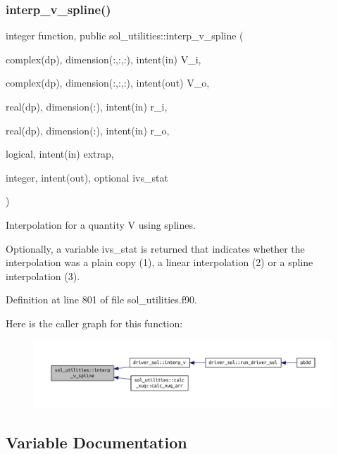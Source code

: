 \subsubsection{\texorpdfstring{interp\+\_\+v\+\_\+spline()}{interp\_v\_spline()}}
{\footnotesize\ttfamily integer function, public sol\+\_\+utilities\+::interp\+\_\+v\+\_\+spline (\begin{DoxyParamCaption}\item[{complex(dp), dimension(\+:,\+:,\+:), intent(in)}]{V\+\_\+i,  }\item[{complex(dp), dimension(\+:,\+:,\+:), intent(out)}]{V\+\_\+o,  }\item[{real(dp), dimension(\+:), intent(in)}]{r\+\_\+i,  }\item[{real(dp), dimension(\+:), intent(in)}]{r\+\_\+o,  }\item[{logical, intent(in)}]{extrap,  }\item[{integer, intent(out), optional}]{ivs\+\_\+stat }\end{DoxyParamCaption})}



Interpolation for a quantity V using splines. 

Optionally, a variable \textquotesingle{}ivs\+\_\+stat\textquotesingle{} is returned that indicates whether the interpolation was a plain copy (1), a linear interpolation (2) or a spline interpolation (3). 

Definition at line 801 of file sol\+\_\+utilities.\+f90.

Here is the caller graph for this function\+:\nopagebreak
\begin{figure}[H]
\begin{center}
\leavevmode
\includegraphics[width=350pt]{namespacesol__utilities_a9af30f5bb948778dcafa7b80af6ea1fa_icgraph}
\end{center}
\end{figure}


\subsection{Variable Documentation}
\mbox{\label{namespacesol__utilities_a4779ff845b4ddc046892bf4eb4490dd2}} 
